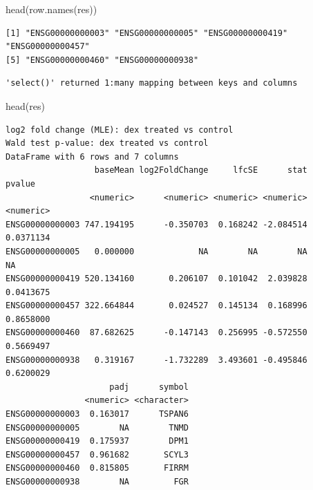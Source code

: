 \documentclass[
  letterpaper,
  DIV=11,
  numbers=noendperiod]{scrartcl}
\newenvironment{Shaded}{\begin{snugshade}}{\end{snugshade}}
\newcommand{\AttributeTok}[1]{\textcolor[rgb]{0.40,0.45,0.13}{#1}}
\newcommand{\CommentTok}[1]{\textcolor[rgb]{0.37,0.37,0.37}{#1}}
\newcommand{\FunctionTok}[1]{\textcolor[rgb]{0.28,0.35,0.67}{#1}}
\newcommand{\NormalTok}[1]{\textcolor[rgb]{0.00,0.23,0.31}{#1}}
\newcommand{\OtherTok}[1]{\textcolor[rgb]{0.00,0.23,0.31}{#1}}
\newcommand{\SpecialCharTok}[1]{\textcolor[rgb]{0.37,0.37,0.37}{#1}}
\newcommand{\StringTok}[1]{\textcolor[rgb]{0.13,0.47,0.30}{#1}}
\begin{document}
\begin{Shaded}
\begin{Highlighting}[]
\FunctionTok{head}\NormalTok{(}\FunctionTok{row.names}\NormalTok{(res))}
\end{Highlighting}
\end{Shaded}

\begin{verbatim}
[1] "ENSG00000000003" "ENSG00000000005" "ENSG00000000419" "ENSG00000000457"
[5] "ENSG00000000460" "ENSG00000000938"
\end{verbatim}

\begin{Shaded}
\end{Shaded}

\begin{verbatim}
'select()' returned 1:many mapping between keys and columns
\end{verbatim}

\begin{Shaded}
\begin{Highlighting}[]
\FunctionTok{head}\NormalTok{(res)}
\end{Highlighting}
\end{Shaded}

\begin{verbatim}
log2 fold change (MLE): dex treated vs control 
Wald test p-value: dex treated vs control 
DataFrame with 6 rows and 7 columns
                  baseMean log2FoldChange     lfcSE      stat    pvalue
                 <numeric>      <numeric> <numeric> <numeric> <numeric>
ENSG00000000003 747.194195      -0.350703  0.168242 -2.084514 0.0371134
ENSG00000000005   0.000000             NA        NA        NA        NA
ENSG00000000419 520.134160       0.206107  0.101042  2.039828 0.0413675
ENSG00000000457 322.664844       0.024527  0.145134  0.168996 0.8658000
ENSG00000000460  87.682625      -0.147143  0.256995 -0.572550 0.5669497
ENSG00000000938   0.319167      -1.732289  3.493601 -0.495846 0.6200029
                     padj      symbol
                <numeric> <character>
ENSG00000000003  0.163017      TSPAN6
ENSG00000000005        NA        TNMD
ENSG00000000419  0.175937        DPM1
ENSG00000000457  0.961682       SCYL3
ENSG00000000460  0.815805       FIRRM
ENSG00000000938        NA         FGR
\end{verbatim}
\end{document}

